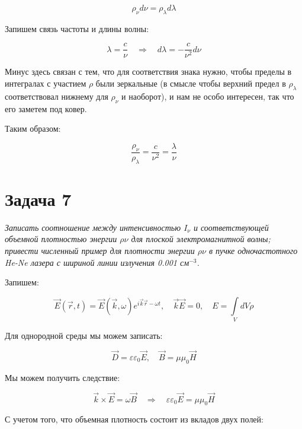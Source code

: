 \documentclass[a4paper, 12pt]{article}
\newcommand{\qrq}
{\ensuremath{\quad \Rightarrow \quad}} %
\renewcommand{\epsilon}{\varepsilon} %
\begin{document}
\begin{equation}
	\rho_\nu d\nu = \rho_\lambda d\lambda
\end{equation}

Запишем связь частоты и длины волны:

\begin{equation}
	\lambda = \frac{c}{\nu} \qrq d\lambda = -\frac{c}{\nu^2} d\nu
\end{equation}

Минус здесь связан с тем, что для соответствия знака нужно, чтобы пределы в интегралах с участием $\rho$ были зеркальные (в смысле чтобы верхний предел в $\rho_\lambda$ соответствовал нижнему для $\rho_\nu$ и наоборот), и нам не особо интересен, так что его заметем под ковер.

Таким образом:

\begin{equation}
	\frac{\rho_\nu}{\rho_\lambda} = \frac{c}{\nu^2} = \frac{\lambda}{\nu}
\end{equation}

\section{Задача 7}

\textit{Записать соотношение между интенсивностью $I_\nu$ и соответствующей объемной
	плотностью энергии $\rho\nu$ для плоской электромагнитной волны; привести численный пример
	для плотности энергии $\rho\nu$ в пучке одночастотного He-Ne лазера с шириной линии излучения 0.001 см$^{-3}$.}

Запишем:

\begin{equation}
	\vec{E}(\vec{r}, t) = \vec{E}(\vec{k}, \omega) e^{i \vec{k}\vec{r} - \omega t}, \quad \vec{k}\vec{E} = 0, \quad E = \int\limits_Vd V \rho
\end{equation}

Для однородной среды мы можем записать:

\begin{equation}
	\vec{D} = \epsilon \epsilon_0 \vec{E}, \quad \vec{B} = \mu\mu_0 \vec{H}
\end{equation}

Мы можем получить следствие:

\begin{equation}
	\vec{k}\times \vec{E}= \omega \vec{B} \qrq \epsilon \epsilon_0 \vec{E} = \mu\mu_0 \vec{H}
\end{equation}

С учетом того, что объемная плотность состоит из вкладов двух полей:
\end{document}
